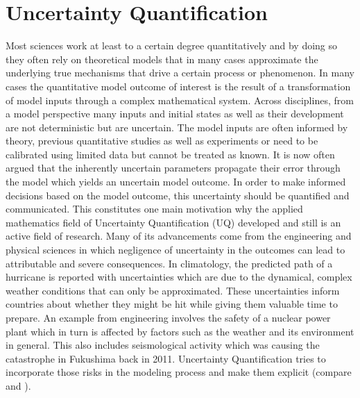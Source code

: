 \section{Uncertainty Quantification} \label{uq}
\thispagestyle{plain} %

Most sciences work at least to a certain degree quantitatively and by doing so they often rely on theoretical models that in many cases approximate the underlying true mechanisms that drive a certain process or phenomenon. In many cases the quantitative model outcome of interest is the result of a transformation of model inputs through a complex mathematical system. Across disciplines, from a model perspective many inputs and initial states as well as their development are not deterministic but are uncertain. The model inputs are often informed by theory, previous quantitative studies as well as experiments or need to be calibrated using limited data but cannot be treated as known. It is now often argued that the inherently uncertain parameters propagate their error through the model which yields an uncertain model outcome. In order to make informed decisions based on the model outcome, this uncertainty should be quantified and communicated. This constitutes one main motivation why the applied mathematics field of Uncertainty Quantification (UQ) developed and still is an active field of research. Many of its advancements come from the engineering and physical sciences in which negligence of uncertainty in the outcomes can lead to attributable and severe consequences. In climatology, the predicted path of a hurricane is reported with uncertainties which are due to the dynamical, complex weather conditions that can only be approximated. These uncertainties inform countries about whether they might be hit while giving them valuable time to prepare. An example from engineering involves the safety of a nuclear power plant which in turn is affected by factors such as the weather and its environment in general. This also includes seismological activity which was causing the catastrophe in Fukushima back in 2011. Uncertainty Quantification tries to incorporate those risks in the modeling process and make them explicit (compare \cite{Sullivan.2015} and \cite{Smith.2013}).

